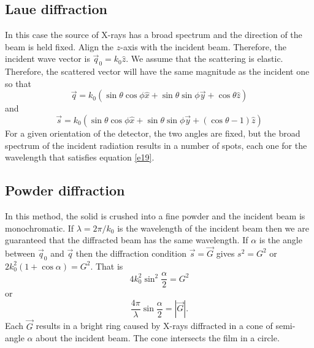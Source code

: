 \documentclass{article}
\begin{document}
\subsection{Laue diffraction}
In this case the source of X-rays has a broad spectrum and the direction of the
beam is held fixed. Align the $z$-axis with the incident beam. Therefore, the
incident wave vector is $\vec{q}_0 = k_0\hat{z}$. We assume that the scattering
is elastic. Therefore, the scattered vector will have the same magnitude as the
incident one so that
\begin{equation}\label{e18}
\vec{q} = k_0(\sin\theta\cos\phi\hat{x} + \sin\theta\sin\phi\vec{y} + 
\cos\theta\hat{z})
\end{equation}
and
\begin{equation}\label{e19}
\vec{s} = k_0(\sin\theta\cos\phi\hat{x} + \sin\theta\sin\phi\vec{y} + 
(\cos\theta - 1)\hat{z})
\end{equation}
For a given orientation of the detector, the two angles are fixed, but the
broad spectrum of the incident radiation results in a number of spots, each
one for the wavelength that satisfies equation \eqref{e19}.

\subsection{Powder diffraction}
In this method, the solid is crushed into a fine powder and the incident beam is
monochromatic. If $\lambda = 2\pi/k_0$ is the wavelength of the incident beam
then we are guaranteed that the diffracted beam has the same wavelength. If $
\alpha$ is the angle between $\vec{q}_0$ and $\vec{q}$ then the diffraction
condition $\vec{s} = \vec{G}$ gives $s^2 = G^2$ or $2k_0^2(1 + \cos\alpha) = 
G^2$. That is
\[
4k_0^2\sin^2\frac{\alpha}{2} = G^2
\]
or
\begin{equation}\label{e20}
\frac{4\pi}{\lambda}\sin\frac{\alpha}{2} = |\vec{G}|.
\end{equation}
Each $\vec{G}$ results in a bright ring caused by X-rays diffracted in a cone
of semi-angle $\alpha$ about the incident beam. The cone intersects the film in
a circle.
\end{document}
